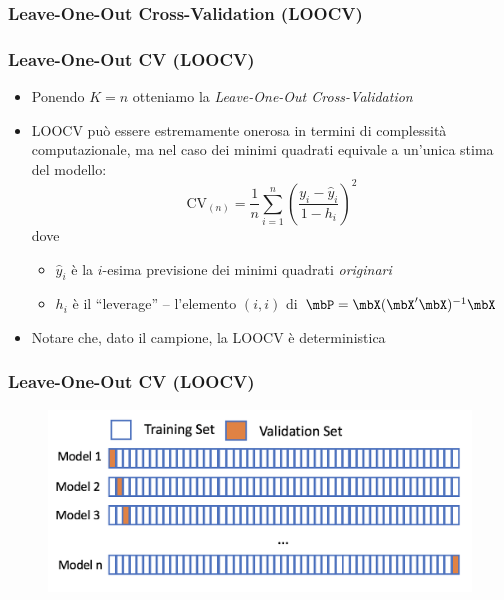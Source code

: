 \subsubsection[Leave-One-Out Cross-Validation]{Leave-One-Out Cross-Validation  (LOOCV)}
\begin{frame}
	\frametitle{Leave-One-Out CV (LOOCV)}
	\begin{itemize}
		\item Ponendo $K=n$ otteniamo la \emph{Leave-One-Out Cross-Validation}
		\item LOOCV può essere estremamente onerosa in termini di complessità computazionale, ma nel caso dei minimi quadrati equivale a un'unica stima del modello:
		\[
		\mbox{CV}_{(n)} = \frac{1}{n} \sum_{i=1}^n \left(\frac{y_i-\hat y_i}{1-h_i}\right)^2
		\]
		dove
		\begin{itemize}
			\item $\hat y_i$ è la $i$-esima previsione dei minimi quadrati \emph{originari}

			\item $h_i$ è il ``leverage'' -- l'elemento $(i,i)$ di $\mbP=\mbX(\mbX^\prime \mbX)^{-1} \mbX$
		\end{itemize}

		\item Notare che, dato il campione, la LOOCV è deterministica
	\end{itemize}
\end{frame}


\begin{frame}

	\frametitle{Leave-One-Out CV (LOOCV)}
	\begin{figure}[!htbp]
		\centering
		\includegraphics[width=0.90\linewidth]{images/supervised/validation_test_splitting_data/loocv.png}
	\end{figure}
\end{frame}



